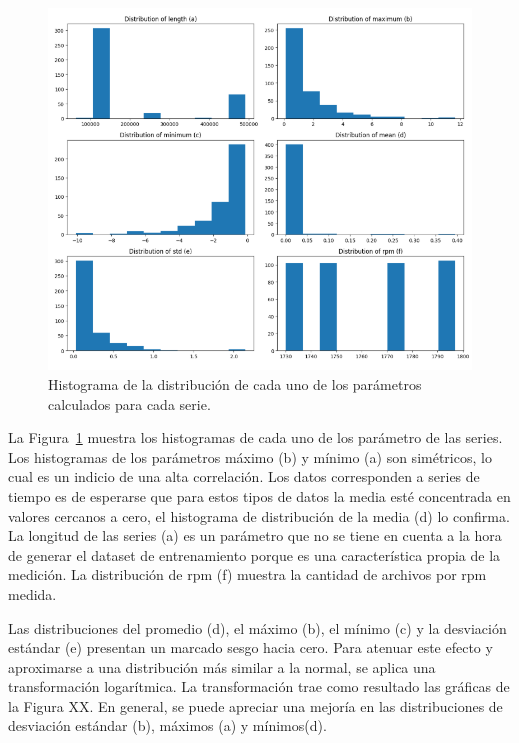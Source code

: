 \documentclass[11pt,a4paper,spanish]{book}
\numberwithin{equation}{chapter}
\numberwithin{figure}{chapter}
\begin{document}
\begin{figure}[h]
    \centering
    \includegraphics[width=1\textwidth]{media/dataset/histogram-01.png}
    \caption{Histograma de la distribución de cada uno de los parámetros calculados para cada serie. }
    \label{fig:figHistogram01}
\end{figure}


La Figura~\ref{fig:figHistogram01} muestra los histogramas de cada uno de los parámetro de las series. Los histogramas de los parámetros máximo (b) y mínimo (a) son simétricos, lo cual es un indicio de una alta correlación. Los datos corresponden a series de tiempo es de esperarse que para estos tipos de datos la media esté concentrada en valores cercanos a cero, el histograma de distribución de la media (d) lo confirma. La longitud de las series (a) es un parámetro que no se tiene en cuenta a la hora de generar el dataset de entrenamiento porque es una característica propia de la medición. La distribución de rpm (f) muestra la cantidad de archivos por rpm medida.    


Las distribuciones del promedio (d), el máximo (b), el mínimo (c) y la desviación estándar (e) presentan un marcado sesgo hacia cero. Para atenuar este efecto y aproximarse a una distribución más similar a la normal, se aplica una transformación logarítmica. La transformación trae como resultado las gráficas de la Figura XX. En general, se puede apreciar una mejoría en las distribuciones de desviación estándar (b), máximos (a) y mínimos(d). 
\end{document}

